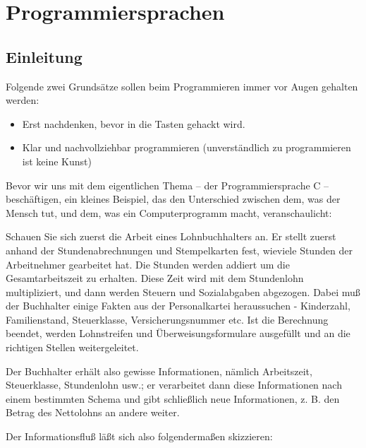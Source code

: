 \chapter{Programmiersprachen}

\section{Einleitung}
Folgende zwei Grundsätze sollen beim Programmieren immer vor Augen gehalten werden:
\begin{itemize}
	\item Erst nachdenken, bevor in die Tasten gehackt wird.
	\item Klar und nachvollziehbar programmieren (unverständlich zu programmieren ist keine Kunst)
\end{itemize}

Bevor wir uns mit dem eigentlichen Thema – der Programmiersprache C – beschäftigen, ein kleines Beispiel, das den Unterschied zwischen dem, was der Mensch tut, und dem, was ein Computerprogramm macht, veranschaulicht:

\begin{tcolorbox}[colbacktitle=red!50!white,
	title=Beispiel,coltitle=black,
	fonttitle=\bfseries]
	
	Schauen Sie sich zuerst die Arbeit eines Lohnbuchhalters an. Er stellt zuerst anhand der Stundenabrechnungen und Stempelkarten fest, wieviele Stunden der Arbeitnehmer gearbeitet hat. Die Stunden werden addiert um die Gesamtarbeitszeit zu erhalten. Diese Zeit wird mit dem Stundenlohn multipliziert, und dann werden Steuern und Sozialabgaben abgezogen. Dabei muß der Buchhalter einige Fakten aus der Personalkartei heraussuchen - Kinderzahl, Familienstand, Steuerklasse, Versicherungsnummer etc. Ist die Berechnung beendet, werden Lohnstreifen und Überweisungsformulare ausgefüllt und an die richtigen Stellen weitergeleitet. 
	
	Der Buchhalter erhält also gewisse Informationen, nämlich Arbeitszeit, Steuerklasse, Stundenlohn usw.; er verarbeitet dann diese Informationen nach einem bestimmten Schema und gibt schließlich neue Informationen, z. B. den Betrag des Nettolohns an andere weiter.

\end{tcolorbox}

Der Informationsfluß läßt sich also folgendermaßen skizzieren: 


